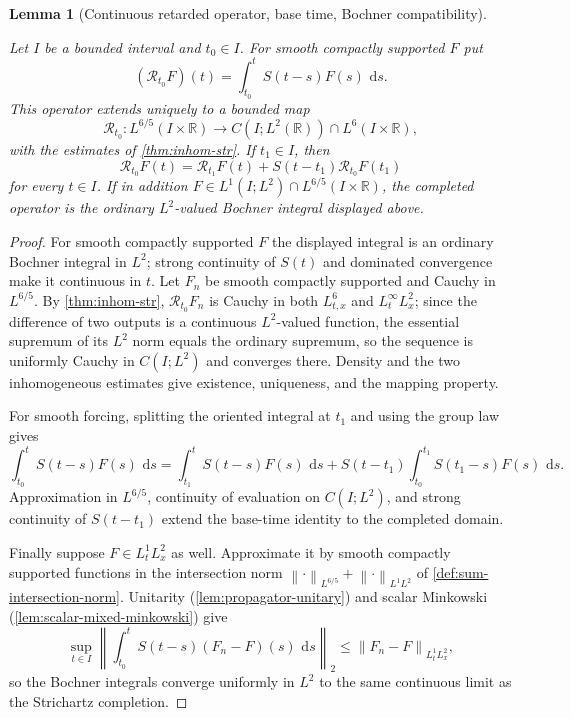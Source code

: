 \documentclass[11pt,oneside]{book}
\providecommand{\uses}[1]{}
\newtheorem{lemma}[theorem]{Lemma}
\theoremstyle{definition}
\theoremstyle{remark}
\newcommand{\R}{\mathbb R}
\newcommand{\1}{\mathbf 1}
\newcommand{\dd}{\,\mathrm d}
\newcommand{\norm}[1]{\left\lVert #1\right\rVert}
\begin{document}
\begin{lemma}[Continuous retarded operator, base time, Bochner compatibility]\label{lem:retarded-continuous}
\uses{thm:inhom-str, def:sum-intersection-norm, def:propagator}
Let $I$ be a bounded interval and $t_0\in I$. For smooth compactly supported $F$ put
\[
 (\mathcal R_{t_0}F)(t)=\int_{t_0}^tS(t-s)F(s)\,\dd s.
\]
This operator extends uniquely to a bounded map
\[
 \mathcal R_{t_0}:L^{6/5}(I\times\R)
 \longrightarrow C(I;L^2(\R))\cap L^6(I\times\R),
\]
with the estimates of \cref{thm:inhom-str}. If $t_1\in I$, then
\[
 \mathcal R_{t_0}F(t)
 =\mathcal R_{t_1}F(t)+S(t-t_1)\mathcal R_{t_0}F(t_1)
\]
for every $t\in I$. If in addition $F\in L^1(I;L^2)\cap L^{6/5}(I\times\R)$, the completed operator is the ordinary $L^2$-valued Bochner integral displayed above.
\end{lemma}

\begin{proof}
\uses{thm:inhom-str, lem:propagator-unitary, lem:scalar-mixed-minkowski}
For smooth compactly supported $F$ the displayed integral is an ordinary Bochner integral in $L^2$; strong continuity of $S(t)$ and dominated convergence make it continuous in $t$. Let $F_n$ be smooth compactly supported and Cauchy in $L^{6/5}$. By \cref{thm:inhom-str}, $\mathcal R_{t_0}F_n$ is Cauchy in both $L^6_{t,x}$ and $L^\infty_tL^2_x$; since the difference of two outputs is a continuous $L^2$-valued function, the essential supremum of its $L^2$ norm equals the ordinary supremum, so the sequence is uniformly Cauchy in $C(I;L^2)$ and converges there. Density and the two inhomogeneous estimates give existence, uniqueness, and the mapping property.

For smooth forcing, splitting the oriented integral at $t_1$ and using the group law gives
\[
 \int_{t_0}^tS(t-s)F(s)\,\dd s
 =\int_{t_1}^tS(t-s)F(s)\,\dd s
   +S(t-t_1)\int_{t_0}^{t_1}S(t_1-s)F(s)\,\dd s .
\]
Approximation in $L^{6/5}$, continuity of evaluation on $C(I;L^2)$, and strong continuity of $S(t-t_1)$ extend the base-time identity to the completed domain.

Finally suppose $F\in L^1_tL^2_x$ as well. Approximate it by smooth compactly supported functions in the intersection norm $\norm\cdot_{L^{6/5}}+\norm\cdot_{L^1L^2}$ of \cref{def:sum-intersection-norm}. Unitarity (\cref{lem:propagator-unitary}) and scalar Minkowski (\cref{lem:scalar-mixed-minkowski}) give
\[
 \sup_{t\in I}\left\|\int_{t_0}^tS(t-s)(F_n-F)(s)\,\dd s\right\|_2
 \le\norm{F_n-F}_{L^1_tL^2_x},
\]
so the Bochner integrals converge uniformly in $L^2$ to the same continuous limit as the Strichartz completion.
\end{proof}
\end{document}
